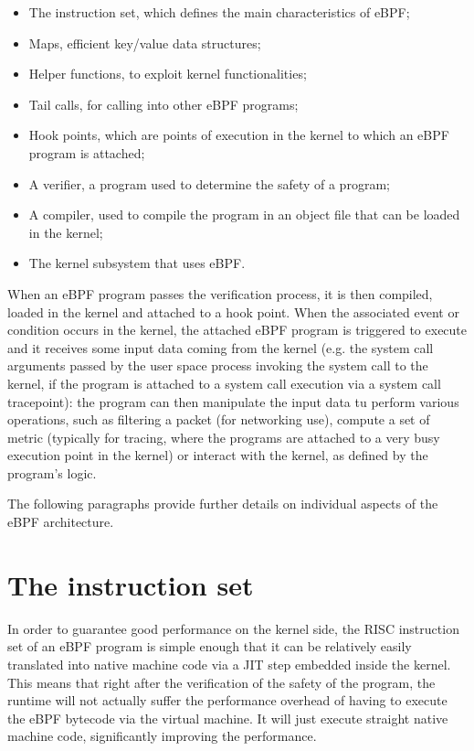 \begin{itemize}
	\item The instruction set, which defines the main characteristics of eBPF;
	\item Maps, efficient key/value data structures;
	\item Helper functions, to exploit kernel functionalities;
	\item Tail calls, for calling into other eBPF programs;
	\item Hook points, which are points of execution in the kernel to which an eBPF 
		program	is attached;
	\item A verifier, a program used to determine the safety of a program;
	\item A compiler, used to compile the program in an object file that can be loaded
		in the kernel; 
	\item The kernel subsystem that uses eBPF.
\end{itemize}

When an eBPF program passes the verification process, it is then compiled, loaded in the kernel and attached to a hook point.
When the associated event or condition occurs in the kernel, the attached eBPF program is triggered to execute and it receives some input data coming from the kernel (e.g. the system call arguments passed by the user space process invoking the system call to the kernel, if the program is attached to a system call execution via a system call tracepoint): the program can then manipulate the input data tu perform various operations, such as filtering a packet (for networking use), compute a set of metric (typically for tracing, where the programs are attached to a very busy execution point in the kernel) or interact with the kernel, as defined by the program's logic.

The following paragraphs provide further details on individual aspects of the eBPF architecture.

\section{The instruction set}

In order to guarantee good performance on the kernel side, the RISC instruction set of an eBPF program is simple enough that it can be relatively easily translated into native machine code via a JIT step embedded inside the kernel. 
This means that right after the verification of the safety of the program, the runtime will not actually suffer the performance overhead of having to execute the eBPF bytecode via the virtual machine. 
It will just execute straight native machine code, significantly improving the performance.

